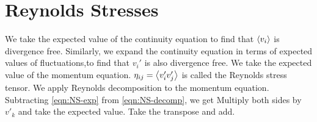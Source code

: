 \section{Reynolds Stresses}
We take the expected value of the continuity equation to find that $\expval{v_i}$ is divergence free.
Similarly, we expand the continuity equation in terms of expected values of fluctuations,to find that $v_i'$ is also divergence free.
We take the expected value of the momentum equation.
$\eta_{ij}=\expval{v'_iv'_j}$ is called the Reynolds stress tensor. We apply Reynolds decomposition to the momentum equation.
Subtracting \autoref{eqn:NS-exp} from \autoref{eqn:NS-decomp}, we get
Multiply both sides by $v'_k$ and take the expected value.
Take the transpose and add.
